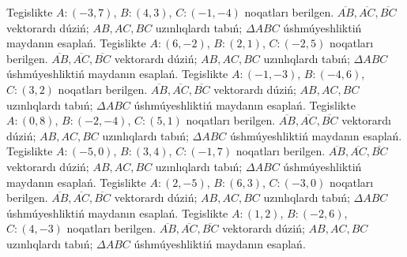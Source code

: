 Tegislikte $A: (-3, 7)$, $B: (4, 3)$, $C: (-1, -4)$ noqatları berilgen. $\overline{AB}, \overline{AC}, \overline{BC}$ vektorardı dúziń; $AB, AC, BC$ uzınlıqlardı tabıń; $\Delta ABC$ úshmúyeshliktiń maydanın esaplań. 
Tegislikte $A: (6, -2)$, $B: (2, 1)$, $C: (-2, 5)$ noqatları berilgen. $\overline{AB}, \overline{AC}, \overline{BC}$ vektorardı dúziń; $AB, AC, BC$ uzınlıqlardı tabıń; $\Delta ABC$ úshmúyeshliktiń maydanın esaplań. 
Tegislikte $A: (-1, -3)$, $B: (-4, 6)$, $C: (3, 2)$ noqatları berilgen. $\overline{AB}, \overline{AC}, \overline{BC}$ vektorardı dúziń; $AB, AC, BC$ uzınlıqlardı tabıń; $\Delta ABC$ úshmúyeshliktiń maydanın esaplań. 
Tegislikte $A: (0, 8)$, $B: (-2, -4)$, $C: (5, 1)$ noqatları berilgen. $\overline{AB}, \overline{AC}, \overline{BC}$ vektorardı dúziń; $AB, AC, BC$ uzınlıqlardı tabıń; $\Delta ABC$ úshmúyeshliktiń maydanın esaplań. 
Tegislikte $A: (-5, 0)$, $B: (3, 4)$, $C: (-1, 7)$ noqatları berilgen. $\overline{AB}, \overline{AC}, \overline{BC}$ vektorardı dúziń; $AB, AC, BC$ uzınlıqlardı tabıń; $\Delta ABC$ úshmúyeshliktiń maydanın esaplań. 
Tegislikte $A: (2, -5)$, $B: (6, 3)$, $C: (-3, 0)$ noqatları berilgen. $\overline{AB}, \overline{AC}, \overline{BC}$ vektorardı dúziń; $AB, AC, BC$ uzınlıqlardı tabıń; $\Delta ABC$ úshmúyeshliktiń maydanın esaplań. 
Tegislikte $A: (1, 2)$, $B: (-2, 6)$, $C: (4, -3)$ noqatları berilgen. $\overline{AB}, \overline{AC}, \overline{BC}$ vektorardı dúziń; $AB, AC, BC$ uzınlıqlardı tabıń; $\Delta ABC$ úshmúyeshliktiń maydanın esaplań. 

